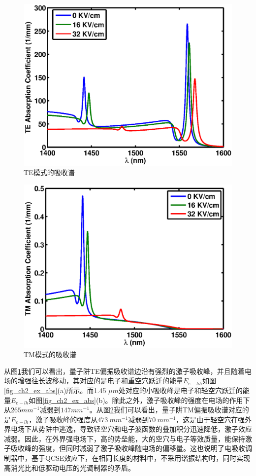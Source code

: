 \begin{figure}[htb]
	\centering
	\includegraphics[width=12cm]{./Pictures/fig_ch2_te_abs.eps}
	\caption{TE模式的吸收谱}
	\label{fig_ch2_te_abs}
\end{figure}
\begin{figure}[htb]
	\centering
	\includegraphics[width=12cm]{./Pictures/fig_ch2_tm_abs.eps}
	\caption{TM模式的吸收谱}
	\label{fig_ch2_tm_abs}
\end{figure}

从图\ref{fig_ch2_te_abs}我们可以看出，量子阱TE偏振吸收谱边沿有强烈的激子吸收峰，并且随着电场的增强往长波移动，其对应的是电子和重空穴跃迁的能量$E_{e-hh}$如图\ref{fig_ch2_ex_abs}(a)所示。而1.45 $\mu m$处对应的小吸收峰是电子和轻空穴跃迁的能量$E_{e-lh}$如图\ref{fig_ch2_ex_abs}(b)。除此之外，激子吸收峰的强度在电场的作用下从$265 mm^{-1}$减弱到$147 mm^{-1}$。从图\ref{fig_ch2_tm_abs}我们可以看出，量子阱TM偏振吸收谱对应的是$E_{e-lh}$，激子吸收峰的强度从$473~ mm^{-1}$减弱到$70~ mm^{-1}$，这是由于轻空穴在强外界电场下从势阱中逃逸，导致轻空穴和电子波函数的叠加积分迅速降低，激子效应减弱。因此，在外界强电场下，高的势垒能，大的空穴与电子等效质量，能保持激子吸收峰的强度，但同时减弱了激子吸收峰随电场的偏移量。这也说明了电吸收调制器中，基于QCSE效应下，在相同长度的材料中，不采用谐振结构时，同时实现高消光比和低驱动电压的光调制器的矛盾。

